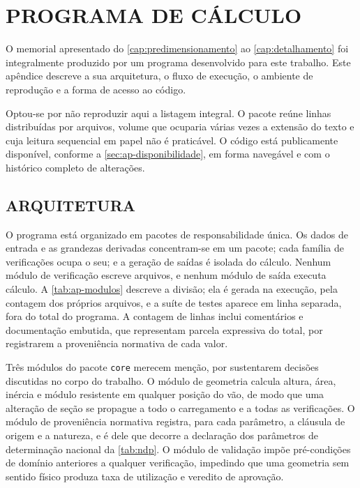 
\chapter{PROGRAMA DE CÁLCULO}\label{ap:codigo-fonte}

O memorial apresentado do \autoref{cap:predimensionamento} ao
\autoref{cap:detalhamento} foi integralmente produzido por um programa
desenvolvido para este trabalho. Este apêndice descreve a sua arquitetura, o
fluxo de execução, o ambiente de reprodução e a forma de acesso ao código.

Optou-se por não reproduzir aqui a listagem integral. O pacote reúne \nLinhasCodigo{}
linhas distribuídas por \nArquivosCodigo{} arquivos, volume que ocuparia
várias vezes a extensão do texto e cuja leitura sequencial em papel não é praticável. O
código está publicamente disponível, conforme a
\autoref{sec:ap-disponibilidade}, em forma navegável e com o histórico completo
de alterações.

\section{ARQUITETURA}\label{sec:ap-arquitetura}

O programa está organizado em pacotes de responsabilidade única. Os dados de
entrada e as grandezas derivadas concentram-se em um pacote; cada família de
verificações ocupa o seu; e a geração de saídas é isolada do cálculo. Nenhum
módulo de verificação escreve arquivos, e nenhum módulo de saída executa
cálculo. A \autoref{tab:ap-modulos} descreve a divisão; ela é gerada na
execução, pela contagem dos próprios arquivos, e a suíte de testes aparece em
linha separada, fora do total do programa. A contagem de linhas
inclui comentários e documentação embutida, que representam parcela expressiva
do total, por registrarem a proveniência normativa de cada valor.



Três módulos do pacote \texttt{core} merecem menção, por sustentarem decisões
discutidas no corpo do trabalho. O módulo de geometria calcula altura, área,
inércia e módulo resistente em qualquer posição do vão, de modo que uma
alteração de seção se propague a todo o carregamento e a todas as verificações.
O módulo de proveniência normativa registra, para cada parâmetro, a cláusula de
origem e a natureza, e é dele que decorre a declaração dos \nNDPExt{} parâmetros
de determinação nacional da \autoref{tab:ndp}. O módulo de validação impõe
pré-condições de domínio anteriores a qualquer verificação, impedindo que uma
geometria sem sentido físico produza taxa de utilização e veredito de aprovação.

